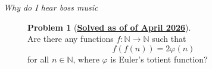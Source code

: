 \documentclass[11pt]{article} %
\theoremstyle{definition}
\newtheorem{problem}{Problem}
\theoremstyle{remark}
\begin{document}
\hfill

\emph{Why do I hear boss music}

\vfill

\begin{figure}[h]
    \begin{Center}
        \begin{minipage}{0.6\linewidth}
            \begin{problem}[\href{https://artofproblemsolving.com/community/c6h3780559p37328805}{\textcolor{green!40!black}{\textbf{Solved as of  of April 2026}}}] \hfill \\
                Are there any functions \(f: \mathbb{N} \to \mathbb{N}\) such that
                \[f(f(n)) = 2\varphi(n)\]
                for all \(n \in \mathbb{N}\), where \(\varphi\) is Euler's totient function?
            \end{problem}
        \end{minipage}
    \end{Center}
\end{figure}

\vfill
\end{document}
